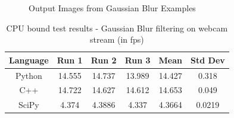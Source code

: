 \documentclass[english]{IEEEtran}
\providecommand{\tabularnewline}{\\}
\theoremstyle{plain}
\begin{document}
\begin{figure}[h]

\caption{\label{fig:Gaussian-Output-Images}Output Images from Gaussian Blur
Examples}

\end{figure}
%
\begin{table}
\caption{\label{tab:Gaussian-Results}CPU bound test results - Gaussian Blur
filtering on webcam stream (in fps)}


\centering{}\begin{tabular}{|c|c|c|c|c|c|}
\hline 
Language & Run 1 & Run 2 & Run 3 & Mean & Std Dev\tabularnewline
\hline
\hline 
Python & 14.555 & 14.737 & 13.989 & 14.427 & 0.318\tabularnewline
\hline 
C++ & 14.722 & 14.627 & 14.612 & 14.653 & 0.049\tabularnewline
\hline 
SciPy & 4.374 & 4.3886 & 4.337 & 4.3664 & 0.0219\tabularnewline
\hline
\end{tabular}
\end{table}
%
\end{document}
